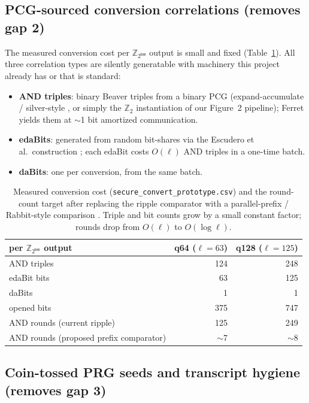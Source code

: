 \documentclass[11pt]{article}
\newcommand{\Z}{\mathbb{Z}}
\newcommand{\modtwo}{\Z_{2^{\mathsf{bw}}}}
\begin{document}
\subsection{PCG-sourced conversion correlations (removes gap 2)}
\label{sec:convert}

The measured conversion cost per $\modtwo$ output is small and fixed
(Table~\ref{tab:convert}). All three correlation types are silently
generatable with machinery this project already has or that is standard:

\begin{itemize}[leftmargin=2em]
\item \textbf{AND triples}: binary Beaver triples from a binary PCG
  (expand-accumulate / silver-style \cite{couteau2021silver}, or simply the
  $\Z_2$ instantiation of our Figure~2 pipeline); Ferret \cite{yang2020ferret}
  yields them at $\sim$1 bit amortized communication.
\item \textbf{edaBits}: generated from random bit-shares via the
  Escudero et al.\ construction \cite{escudero2020edabits}; each edaBit costs
  $O(\ell)$ AND triples in a one-time batch.
\item \textbf{daBits}: one per conversion, from the same batch.
\end{itemize}

\begin{table}[h]
\centering
\begin{tabular}{lrr}
\toprule
per $\modtwo$ output & q64 ($\ell{=}63$) & q128 ($\ell{=}125$) \\
\midrule
AND triples   & 124 & 248 \\
edaBit bits   & 63  & 125 \\
daBits        & 1   & 1   \\
opened bits   & 375 & 747 \\
AND rounds (current ripple) & 125 & 249 \\
AND rounds (proposed prefix comparator) & $\sim$7 & $\sim$8 \\
\bottomrule
\end{tabular}
\caption{Measured conversion cost (\texttt{secure\_convert\_prototype.csv})
and the round-count target after replacing the ripple comparator with a
parallel-prefix / Rabbit-style comparison \cite{makri2021rabbit}. Triple and
bit counts grow by a small constant factor; rounds drop from $O(\ell)$ to
$O(\log \ell)$.}
\label{tab:convert}
\end{table}

\subsection{Coin-tossed PRG seeds and transcript hygiene (removes gap 3)}
\end{document}
